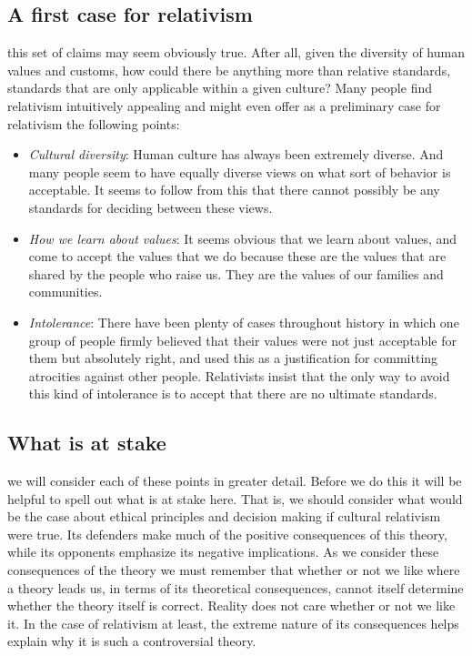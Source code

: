 \documentclass[justified]{tufte-book}
\providecommand{\tightlist}{%
  \setlength{\itemsep}{0pt}\setlength{\parskip}{0pt}}
\begin{document}
\hypertarget{a-first-case-for-relativism}{%
\subsection*{A first case for relativism}\label{a-first-case-for-relativism}}

 this set of claims may seem obviously true. After all, given the diversity of human values and customs, how could there be anything more than relative standards, standards that are only applicable within a given culture? Many people find relativism intuitively appealing and might even offer as a preliminary case for relativism the following points:

\begin{itemize}
\tightlist
\item
  \emph{Cultural diversity}: Human culture has always been extremely diverse. And many people seem to have equally diverse views on what sort of behavior is acceptable. It seems to follow from this that there cannot possibly be any standards for deciding between these views.
\item
  \emph{How we learn about values}: It seems obvious that we learn about values, and come to accept the values that we do because these are the values that are shared by the people who raise us. They are the values of our families and communities.
\item
  \emph{Intolerance}: There have been plenty of cases throughout history in which one group of people firmly believed that their values were not just acceptable for them but absolutely right, and used this as a justification for committing atrocities against other people. Relativists insist that the only way to avoid this kind of intolerance is to accept that there are no ultimate standards.
\end{itemize}

\hypertarget{what-is-at-stake}{%
\subsection*{What is at stake}\label{what-is-at-stake}}

 we will consider each of these points in greater detail. Before we do this it will be helpful to spell out what is at stake here. That is, we should consider what would be the case about ethical principles and decision making if cultural relativism were true. Its defenders make much of the positive consequences of this theory, while its opponents emphasize its negative implications. As we consider these consequences of the theory we must remember that whether or not we like where a theory leads us, in terms of its theoretical consequences, cannot itself determine whether the theory itself is correct. Reality does not care whether or not we like it. In the case of relativism at least, the extreme nature of its consequences helps explain why it is such a controversial theory.
\end{document}
